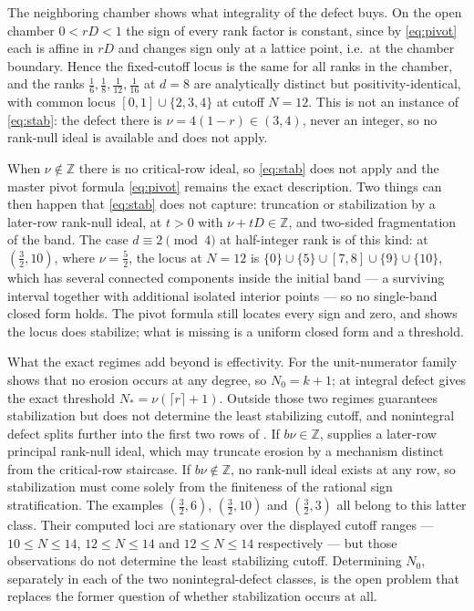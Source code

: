 \documentclass[11pt,letterpaper]{article}
\newcommand{\Zint}{\mathbb{Z}}
\begin{document}
The neighboring chamber shows what integrality of the defect buys. On the open
chamber $0<rD<1$ the sign of every rank factor is constant, since by
\eqref{eq:pivot} each is affine in $rD$ and changes sign only at a lattice point,
i.e.\ at the chamber boundary. Hence the fixed-cutoff locus is the same for all
ranks in the chamber, and the ranks $\tfrac16,\tfrac18,\tfrac1{12},\tfrac1{16}$
at $d=8$ are analytically distinct but positivity-identical, with common locus
$[0,1]\cup\{2,3,4\}$ at cutoff $N=12$. This is not an instance of \eqref{eq:stab}:
the defect there is $\nu=4(1-r)\in(3,4)$, never an integer, so no rank-null ideal
is available and  does not apply.

\begin{remark}
\label{rem:nonintegral-nu}
When $\nu\notin\Zint$ there is no critical-row ideal, so \eqref{eq:stab} does not
apply and the master pivot formula \eqref{eq:pivot} remains the exact description.
Two things can then happen that \eqref{eq:stab} does not capture: truncation or
stabilization by a later-row rank-null ideal, at $t>0$ with $\nu+tD\in\Zint$, and
two-sided fragmentation of the band. The case $d\equiv2\pmod4$ at half-integer rank is of this kind: at
$(\tfrac32,10)$, where $\nu=\tfrac52$, the locus at $N=12$ is
$\{0\}\cup\{5\}\cup[7,8]\cup\{9\}\cup\{10\}$, which has several connected
components inside the initial band --- a surviving interval together with
additional isolated interior points --- so no single-band closed form holds. The
pivot formula still locates every sign and zero, and  shows the
locus does stabilize; what is missing is a uniform closed form and a threshold.
\end{remark}

What the exact regimes add beyond  is effectivity. For the
unit-numerator family  shows that no erosion occurs at any
degree, so $N_0=k+1$; at integral defect  gives the exact threshold
$N_*=\nu(\lceil r\rceil+1)$. Outside those two regimes 
guarantees stabilization but does not determine the least stabilizing cutoff, and
nonintegral defect splits further into the first two rows of . If
$b\nu\in\Zint$,  supplies a later-row principal rank-null
ideal, which may truncate erosion by a mechanism distinct from the critical-row
staircase. If $b\nu\notin\Zint$, no rank-null ideal exists at any row, so
stabilization must come solely from the finiteness of the rational sign
stratification. The examples $(\tfrac32,6)$, $(\tfrac32,10)$ and $(\tfrac32,3)$
all belong to this latter class. Their computed loci are stationary over the
displayed cutoff ranges --- $10\le N\le14$, $12\le N\le14$ and $12\le N\le14$
respectively --- but those observations do not determine the least stabilizing
cutoff. Determining $N_0$, separately in each of the two nonintegral-defect
classes, is the open problem that replaces the former question of whether
stabilization occurs at all.
\end{document}
